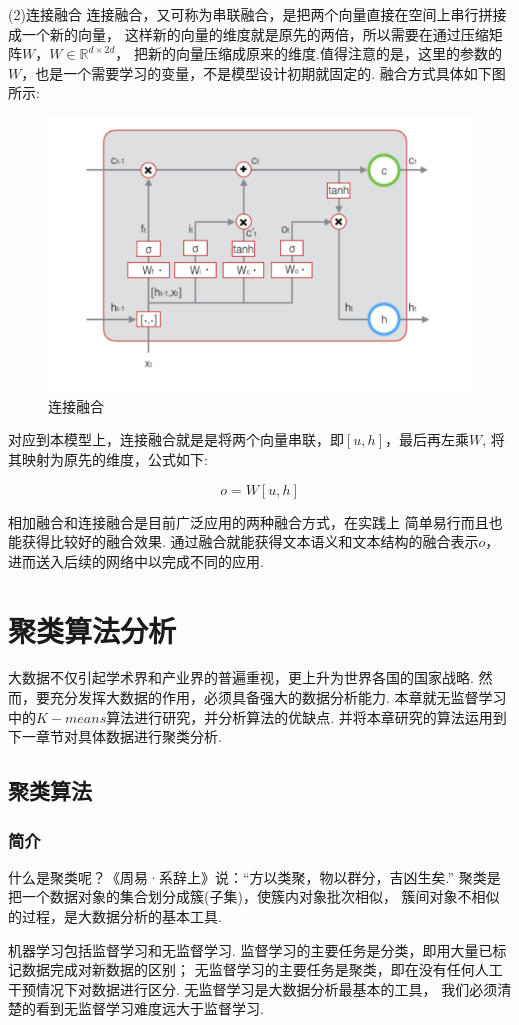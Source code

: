 \documentclass[bachelor,adobefonts]{jnuthesis}
\begin{document}
(2)连接融合
连接融合，又可称为串联融合，是把两个向量直接在空间上串行拼接成一个新的向量，
这样新的向量的维度就是原先的两倍，所以需要在通过压缩矩阵$W$，$W \in \mathbb{R}^{d \times 2d}$，
把新的向量压缩成原来的维度.值得注意的是，这里的参数的$W$，也是一个需要学习的变量，不是模型设计初期就固定的.
融合方式具体如下图所示:
\begin{figure}[h!]
  \centering
  \includegraphics[width=0.4\linewidth]{LSTM.png}
  \caption{连接融合}
\end{figure}

对应到本模型上，连接融合就是是将两个向量串联，即$[u,h]$，最后再左乘$W$,
将其映射为原先的维度，公式如下:

\begin{equation}
  o = W[u,h]
\end{equation}

相加融合和连接融合是目前广泛应用的两种融合方式，在实践上
简单易行而且也能获得比较好的融合效果.
通过融合就能获得文本语义和文本结构的融合表示$o$，进而送入后续的网络中以完成不同的应用.


\chapter{聚类算法分析}
大数据不仅引起学术界和产业界的普遍重视，更上升为世界各国的国家战略.
然而，要充分发挥大数据的作用，必须具备强大的数据分析能力.
本章就无监督学习中的$K-means$算法进行研究，并分析算法的优缺点.
并将本章研究的算法运用到下一章节对具体数据进行聚类分析.

\section{聚类算法}
\subsection{简介}
什么是聚类呢？《周易·系辞上》说：“方以类聚，物以群分，吉凶生矣.”
聚类是把一个数据对象的集合划分成簇(子集)，使簇内对象批次相似，
簇间对象不相似的过程，是大数据分析的基本工具.

机器学习包括监督学习和无监督学习.
监督学习的主要任务是分类，即用大量已标记数据完成对新数据的区别；
无监督学习的主要任务是聚类，即在没有任何人工干预情况下对数据进行区分.
无监督学习是大数据分析最基本的工具，
我们必须清楚的看到无监督学习难度远大于监督学习.
\end{document}
